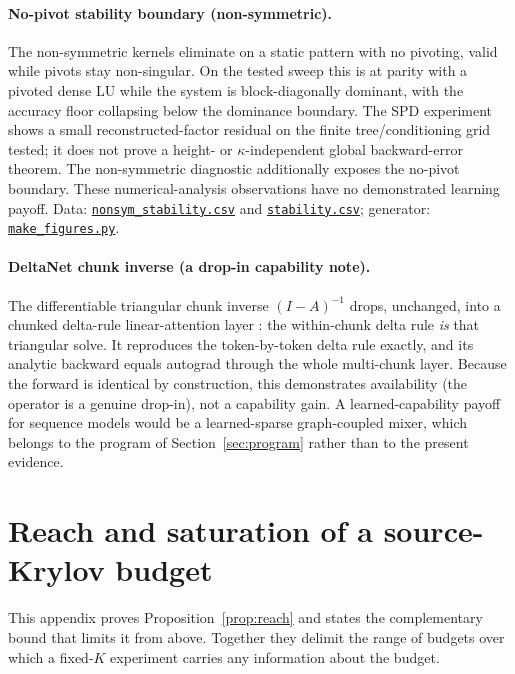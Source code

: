 \paragraph{No-pivot stability boundary (non-symmetric).}
The non-symmetric kernels eliminate on a static pattern with no pivoting,
valid while pivots stay non-singular.
On the tested sweep this is at parity with a pivoted dense LU while the
system is block-diagonally dominant, with the accuracy floor collapsing below the
dominance boundary. The SPD experiment shows a small reconstructed-factor
residual on the finite tree/conditioning grid tested; it does not prove a
height- or $\kappa$-independent global backward-error theorem. The
non-symmetric diagnostic additionally exposes the no-pivot boundary. These
numerical-analysis observations have no demonstrated learning payoff. Data:
\href{https://github.com/vanshsehrawat14/gabp-sparse-inv/blob/main/paper/attainability/figures/data/nonsym_stability.csv}
{\texttt{nonsym\_stability.csv}} and
\href{https://github.com/vanshsehrawat14/gabp-sparse-inv/blob/main/paper/attainability/figures/data/stability.csv}
{\texttt{stability.csv}}; generator:
\href{https://github.com/vanshsehrawat14/gabp-sparse-inv/blob/main/paper/attainability/make_figures.py}{\texttt{make\_figures.py}}.

\paragraph{DeltaNet chunk inverse (a drop-in capability note).}
The differentiable triangular chunk inverse $(I-A)^{-1}$ drops, unchanged,
into a chunked delta-rule linear-attention layer
\citep{yang2024parallelizing}: the within-chunk delta rule \emph{is} that
triangular solve. It reproduces the token-by-token delta rule exactly, and
its analytic backward equals autograd through the whole multi-chunk layer.
Because the forward is identical by construction, this demonstrates
availability (the operator is a genuine drop-in), not a capability gain. A
learned-capability payoff for
sequence models would be a learned-sparse graph-coupled mixer, which belongs
to the program of Section~\ref{sec:program} rather than to the present
evidence.

\section{Reach and saturation of a source-Krylov budget}
\label{app:reach}

This appendix proves Proposition~\ref{prop:reach} and states the complementary
bound that limits it from above. Together they delimit the range of budgets
over which a fixed-$K$ experiment carries any information about the budget.

